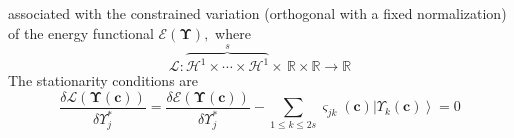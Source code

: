 \documentclass[aps,preprint]{revtex4}%
\begin{document}
associated with the constrained variation (orthogonal with a fixed
normalization) of the energy functional $\mathcal{E}\left(  \mathbf{\Upsilon
}\right)  ,$ where
\[
\mathcal{L}:\overset{s}{\overbrace{\mathcal{H}^{1}\times\cdots\times
\mathcal{H}^{1}}}\times\,\mathbb{R\times R}\rightarrow\mathbb{R}%
\]
The stationarity conditions are
\[
\frac{\delta\mathcal{L}\left(  \mathbf{\Upsilon}\left(  \mathbf{c}\right)
\right)  }{\delta\Upsilon_{j}^{\ast}}=\frac{\delta\mathcal{E}\left(
\mathbf{\Upsilon}\left(  \mathbf{c}\right)  \right)  }{\delta\Upsilon
_{j}^{\ast}}-\sum_{1\leq k\leq2s}\varsigma_{jk}\left(  \mathbf{c}\right)
\left\vert \Upsilon_{k}\left(  \mathbf{c}\right)  \right\rangle =0
\]


\section{}
\end{document}
